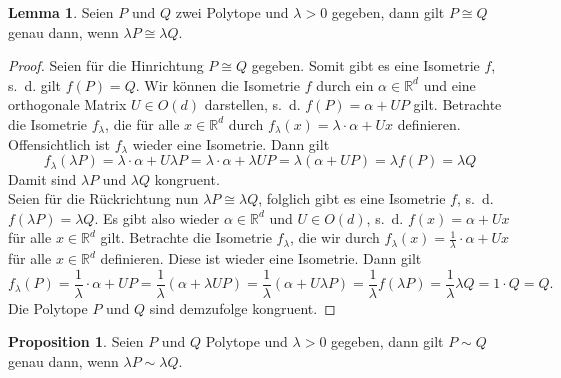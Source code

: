 \documentclass[11pt,titlepage]{article}
\newcommand{\setR}{\mathbb{R}}
\theoremstyle{definition}
\newtheorem{proposition}[theorem]{Proposition}
\newtheorem{lemma}[theorem]{Lemma}
\theoremstyle{remark}
\begin{document}
	\begin{lemma} \label{lemma:dilkong}
		Seien $P$ und $Q$ zwei Polytope und $\lambda>0$ gegeben, dann gilt 
		$P\cong Q$ genau dann, wenn $\lambda P\cong \lambda Q$.
	\end{lemma}
	
	\begin{proof}
		Seien für die Hinrichtung $P\cong Q$ gegeben. Somit gibt es eine Isometrie 
		$f$, s.~d. gilt $f(P)=Q$. Wir können die Isometrie $f$ durch ein $\alpha\in
		\setR^d$ und eine orthogonale Matrix $U\in O(d)$ darstellen, s.~d. 
		$f(P)=\alpha + UP$ gilt. Betrachte die Isometrie $f_{\lambda}$, die 
		für alle $x\in\setR^d$ durch 
		$f_{\lambda}(x)=\lambda\cdot \alpha +Ux$ definieren. 
		Offensichtlich ist $f_{\lambda}$ wieder eine Isometrie. 
		Dann gilt
		\[f_{\lambda}(\lambda P)=\lambda\cdot \alpha+U \lambda P =\lambda\cdot 
		\alpha+\lambda U P =\lambda(\alpha+ U P)=\lambda f(P)=\lambda Q\]
		Damit sind $\lambda P$ und $\lambda Q$ kongruent. \\
		Seien für die Rückrichtung nun $\lambda P\cong \lambda Q$, folglich  
		gibt es eine Isometrie $f$, s.~d. $f(\lambda P)=\lambda Q$. Es gibt 
		also wieder $\alpha\in\setR^d$ und $U\in O(d)$, s.~d. 
		$f(x)=\alpha + Ux$ für alle $x\in\setR^d$ gilt. Betrachte die Isometrie 
		$f_{\lambda}$, die wir durch 
		$f_{\lambda}(x)=\frac{1}{\lambda}\cdot \alpha +U x$ für alle $x\in\setR^d$ 
		definieren. Diese ist wieder eine Isometrie. Dann gilt 
		\[f_{\lambda}(P)=\frac{1}{\lambda}\cdot \alpha +U P 
		=\frac{1}{\lambda}(\alpha+\lambda U P)
		=\frac{1}{\lambda}(\alpha + U \lambda P)
		=\frac{1}{\lambda} f(\lambda P)=\frac{1}{\lambda} \lambda Q =1\cdot Q=Q.\]
		Die Polytope $P$ und $Q$ sind demzufolge kongruent.
	\end{proof}
	
	\begin{proposition} \label{prop:dilzerl}
		Seien $P$ und $Q$ Polytope und $\lambda>0$ gegeben, dann gilt 
		$P\sim Q$ genau dann, wenn $\lambda P\sim \lambda Q$.
	\end{proposition}
	
\end{document}
